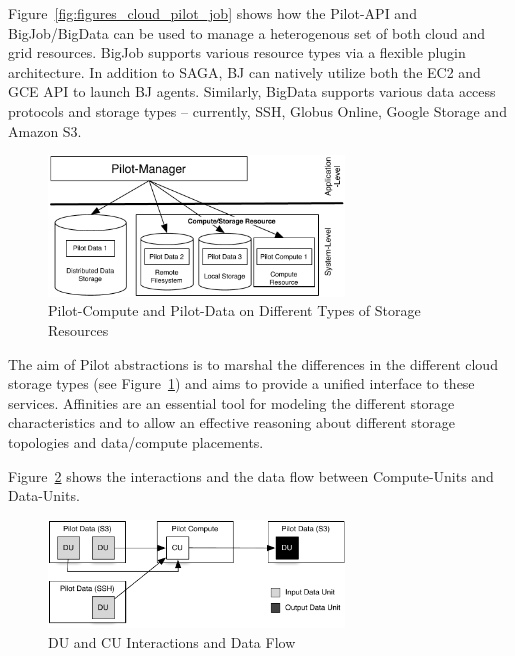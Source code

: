 \documentclass[times]{cpeauth}
\newcommand{\computeunits}{Compute-Units\xspace}
\newcommand{\dataunits}{Data-Units\xspace}
\begin{document}
Figure~\ref{fig:figures_cloud_pilot_job} shows how the Pilot-API and 
BigJob/BigData can be used to manage a heterogenous set of both cloud and grid 
resources. BigJob supports various resource types via a flexible plugin 
architecture. In addition to SAGA, BJ can natively utilize both the EC2 and 
GCE API to launch BJ agents. Similarly, BigData supports various data access
protocols and storage types -- currently, SSH, Globus Online, Google Storage
and Amazon S3.



\begin{figure}[t]
	\centering
		\includegraphics[width=0.7\textwidth]{figures/storage-types.pdf}
	\caption{Pilot-Compute and Pilot-Data on Different Types of Storage Resources}
	\label{fig:figures_storage-types}
\end{figure}

The aim of Pilot abstractions is to marshal the differences in the different 
cloud storage types (see Figure~\ref{fig:figures_storage-types}) and aims to 
provide a unified interface to these services. Affinities are an essential 
tool for modeling the different storage characteristics and to allow an 
effective reasoning about different storage topologies and data/compute 
placements.


Figure~\ref{fig:figures_data-flow} shows the interactions and the data flow 
between \computeunits and \dataunits.
\begin{figure}[htbp]
	\centering
		\includegraphics[width=0.7\textwidth]{figures/data-flow.pdf}
	\caption{DU and CU Interactions and Data Flow}
	\label{fig:figures_data-flow}
\end{figure}
\end{document}
